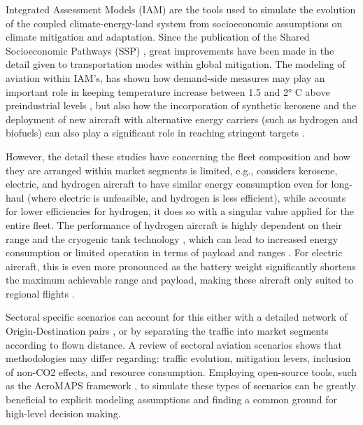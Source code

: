 \documentclass[a4paper,fleqn]{cas-dc}
\begin{document}
Integrated Assessment Models (IAM) are the tools used to simulate the evolution of the coupled climate-energy-land system from socioeconomic assumptions on climate mitigation and adaptation. Since the publication of the Shared Socioeconomic Pathways (SSP) \cite{riahi_shared_2017}, great improvements have been made in the detail given to transportation modes within global mitigation. The modeling of aviation within IAM's, has shown how demand-side measures may play an important role in keeping temperature increase between 1.5 and 2° C above preindustrial levels \cite{sharmina_decarbonising_2021}, but also how the incorporation of synthetic kerosene and the deployment of new aircraft with alternative energy carriers (such as hydrogen and biofuels) can also play a significant role in reaching stringent targets \cite{napp_role_2019, speizer_integrated_2024}.

However, the detail these studies have concerning the fleet composition and how they are arranged within market segments is limited, e.g., \cite{speizer_integrated_2024} considers kerosene, electric, and hydrogen aircraft to have similar energy consumption even for long-haul (where electric is unfeasible, and hydrogen is less efficient), while \cite{napp_role_2019} accounts for lower efficiencies for hydrogen, it does so with a singular value applied for the entire fleet. The performance of hydrogen aircraft is highly dependent on their range and the cryogenic tank technology \cite{adler_hydrogen-powered_2023}, which can lead to increased energy consumption \cite{icct_hydrogen} or limited operation in terms of payload and ranges \cite{icct_fuelcell}. For electric aircraft, this is even more pronounced as the battery weight significantly shortens the maximum achievable range and payload, making these aircraft only suited to regional flights \cite{icct_electric}.

Sectoral specific scenarios can account for this either with a detailed network of Origin-Destination pairs \cite{grewe_evaluating_2021, eaton_regional_2024, hoelzen_h2-powered_2025}, or by separating the traffic into market segments according to flown distance. A review of sectoral aviation scenarios \cite{delbecq_sustainable_2023} shows that methodologies may differ regarding: traffic evolution, mitigation levers, inclusion of non-CO2 effects, and resource consumption. Employing open-source tools, such as the AeroMAPS framework \cite{planes_aeromaps_2023}, to simulate these types of scenarios can be greatly beneficial to explicit modeling assumptions and finding a common ground for high-level decision making.
\end{document}
